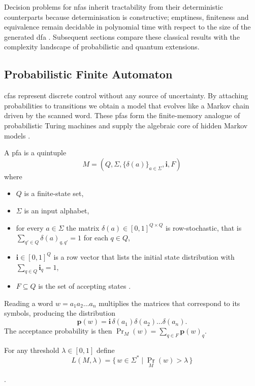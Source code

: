 Decision problems for \glspl{nfa} inherit tractability from their
deterministic counterparts because determinisation is constructive;
emptiness, finiteness and equivalence remain decidable in polynomial
time with respect to the size of the generated \gls{dfa}
\cite{hopcroft2001introduction}.  Subsequent sections compare these classical
results with the complexity landscape of probabilistic and quantum
extensions.

\subsection{Probabilistic Finite Automaton}\label{subsec:pfa}

\glspl{cfa} represent discrete control without any source
of uncertainty.  By attaching probabilities to transitions we obtain a
model that evolves like a Markov chain driven by the scanned word.
These \glspl{pfa} form the finite-memory analogue of probabilistic
Turing machines and supply the algebraic core of hidden Markov models
\cite{rabin1963probabilistic}.

\begin{definition}\label{def:pfa}
  A \gls{pfa} is a quintuple
  \[
    M=(Q,\Sigma,\{\delta(a)\}_{a\in\Sigma},\mathbf{i},F)
  \]
  where
  \begin{itemize}
    \item $Q$ is a finite-state set,
    \item $\Sigma$ is an input alphabet,
    \item for every $a\in\Sigma$ the matrix
          $\delta(a)\in[0,1]^{Q\times Q}$ is
          row-stochastic, that is
          $\sum_{q'\in Q}\delta(a)_{q,q'}=1$ for each $q\in Q$,
    \item $\mathbf{i}\in[0,1]^{Q}$ is a row vector that lists the initial
          state distribution with $\sum_{q\in Q}\mathbf{i}_{q}=1$,
    \item $F\subseteq Q$ is the set of accepting states
          \cite{rabin1963probabilistic}.
  \end{itemize}
\end{definition}
  

Reading a word $w=a_{1}a_{2}\dots a_{n}$ multiplies the matrices that
correspond to its symbols, producing the distribution
\[
  \mathbf{p}(w)=
  \mathbf{i}\,\delta(a_{1})\delta(a_{2})\dots\delta(a_{n}).
\]
The acceptance probability is then
$\Pr_{M}(w)=\sum_{q\in F}\mathbf{p}(w)_{q}$.

\begin{concept}\label{concept:cutpoint}
For any threshold $\lambda\in[0,1]$ define
\[
  L(M,\lambda)=
  \{\,w\in\Sigma^{\ast}\mid\Pr_{M}(w)>\lambda\,\}
\]
\end{concept}\cite{rabin1963probabilistic}.

